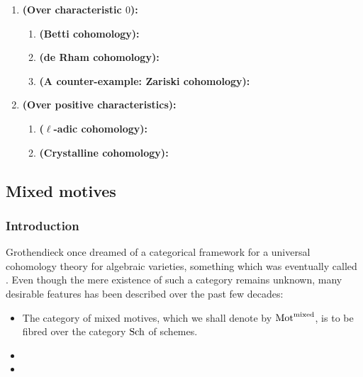                 \begin{example}
                    \noindent
                    \begin{enumerate}
                        \item \textbf{(Over characteristic $0$):} 
                            \begin{enumerate}
                                \item \textbf{(Betti cohomology):}
                                \item \textbf{(de Rham cohomology):}
                                \item \textbf{(A counter-example: Zariski cohomology):}
                            \end{enumerate}
                        \item \textbf{(Over positive characteristics):}
                            \begin{enumerate}
                                \item \textbf{($\ell$-adic cohomology):}
                                \item \textbf{(Crystalline cohomology):}
                            \end{enumerate}
                    \end{enumerate}
                \end{example}
        
        \subsection{Mixed motives}
            \subsubsection{Introduction}
                Grothendieck once dreamed of a categorical framework for a universal cohomology theory for algebraic varieties, something which was eventually called . Even though the mere existence of such a category remains unknown, many desirable features has been described over the past few decades:
                    \begin{itemize}
                        \item The category of mixed motives, which we shall denote by $\mathrm{Mot}^{\mathrm{mixed}}$, is to be fibred over the category $\mathrm{Sch}$ of schemes.
                        \item 
                        \item 
                    \end{itemize}
            
